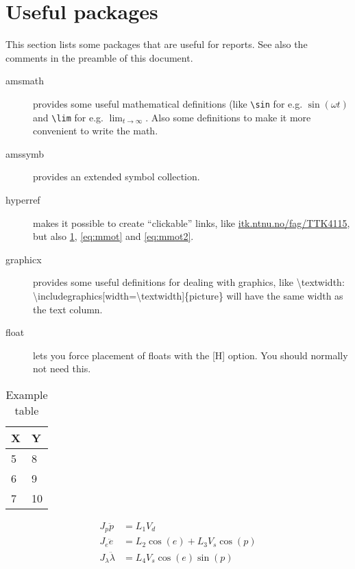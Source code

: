 \section{Useful packages}
This section lists some packages that are useful for reports. See also the comments in the preamble of this document.

\begin{description}
  \item[amsmath] provides some useful mathematical definitions (like \texttt{\textbackslash{sin}} for e.g. $\sin(\omega t)$ and \texttt{\textbackslash{lim}} for e.g. $\lim_{t\to\infty}$. Also some definitions to make it more convenient to write the math.
  \item[amssymb] provides an extended symbol collection.
  \item[hyperref] makes it possible to create ``clickable'' links, like \url{itk.ntnu.no/fag/TTK4115}, but also \cref{tab:extab}, \cref{eq:mmot} and \cref{eq:mmot2}.
  \item[graphicx] provides some useful definitions for dealing with graphics, like \textbackslash{textwidth}: \textbackslash{includegraphics}[width=\textbackslash{textwidth}]\{picture\} will have the same width as the text column.
  \item[float] lets you force placement of floats with the [H] option. You should normally not need this.
\end{description}
\begin{table}[H]
  \caption{Example table}
  \centering
  \begin{tabular}{ll}
    \hline
    \textbf{X} & \textbf{Y}\\
    \hline
    5 & 8\\
    6 & 9\\
    7 & 10 \\
    \hline
  \end{tabular}
  \label{tab:extab}
\end{table}

\begin{subequations}
  \begin{align}
    J_p\ddot{p} &= L_{1}V_{d} \label{eq:mmot1}\\
    J_e\ddot{e} &= L_{2} \cos(e) + L_3 V_s \cos(p) \label{eq:mmot2}\\
    J_\lambda \ddot{\lambda} &= L_4 V_s \cos(e) \sin(p) \label{eq:mmot3}
  \end{align}
  \label{eq:mmot}
\end{subequations}

